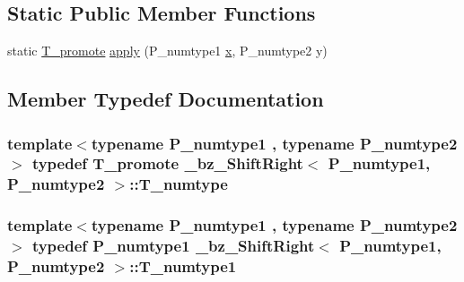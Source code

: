 \subsection*{Static Public Member Functions}
\begin{DoxyCompactItemize}
\item 
static \hyperlink{minmax_8h_aaa88a440c2f0d00798d5b1d42c79308d}{T\+\_\+promote} \hyperlink{class__bz__ShiftRight_a688f4e4aac94c3f251eeca3a9e8ea860}{apply} (P\+\_\+numtype1 \hyperlink{vecnorm1_8cc_ac73eed9e41ec09d58f112f06c2d6cb63}{x}, P\+\_\+numtype2 y)
\end{DoxyCompactItemize}


\subsection{Member Typedef Documentation}
\hypertarget{class__bz__ShiftRight_ac5280f5b1510725bbf85505943565733}{}
\subsubsection[{T\+\_\+numtype}]{\setlength{\rightskip}{0pt plus 5cm}template$<$typename P\+\_\+numtype1 , typename P\+\_\+numtype2 $>$ typedef {\bf T\+\_\+promote} {\bf \+\_\+bz\+\_\+\+Shift\+Right}$<$ P\+\_\+numtype1, P\+\_\+numtype2 $>$\+::{\bf T\+\_\+numtype}}\label{class__bz__ShiftRight_ac5280f5b1510725bbf85505943565733}
\hypertarget{class__bz__ShiftRight_adf5a9911b34694358a171784582d3a97}{}
\subsubsection[{T\+\_\+numtype1}]{\setlength{\rightskip}{0pt plus 5cm}template$<$typename P\+\_\+numtype1 , typename P\+\_\+numtype2 $>$ typedef P\+\_\+numtype1 {\bf \+\_\+bz\+\_\+\+Shift\+Right}$<$ P\+\_\+numtype1, P\+\_\+numtype2 $>$\+::{\bf T\+\_\+numtype1}}\label{class__bz__ShiftRight_adf5a9911b34694358a171784582d3a97}
\hypertarget{class__bz__ShiftRight_a6904d816d9b83ddae1d8ec931b8ad3da}{}
